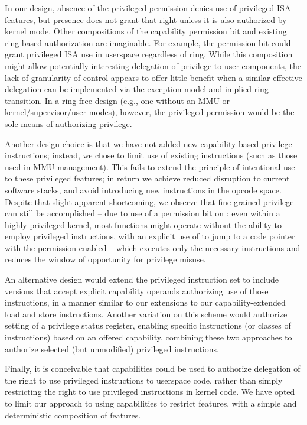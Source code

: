 In our design, absence of the privileged permission denies use of privileged
ISA features, but presence does not grant that right unless it is also
authorized by kernel mode.
Other compositions of the capability permission bit and existing
ring-based authorization are imaginable.
For example, the permission bit could grant privileged ISA use in userspace
regardless of ring.
While this composition might allow potentially interesting delegation of
privilege to user components, the lack of granularity of control appears to
offer little benefit when a similar effective delegation can be implemented
via the exception model and implied ring transition.
In a ring-free design (e.g., one without an MMU or kernel/supervisor/user
modes), however, the privileged permission would be the sole means of
authorizing privilege.

Another design choice is that we have not added new
capability-based privilege instructions; instead, we chose to limit use of
existing instructions (such as those used in MMU management).
This fails to extend the principle of intentional use to these privileged
features; in return we achieve reduced disruption to current software
stacks, and avoid introducing new instructions in the opcode space.
Despite that slight apparent shortcoming,
we observe that fine-grained privilege can still be accomplished --
due to use of a permission bit
on \PCC{}: even within a highly privileged
kernel, most functions might operate without the ability to employ privileged
instructions, with an explicit use of  to jump to a code
pointer with the \cappermASR{} permission enabled -- which
executes
only the necessary instructions and reduces the window of opportunity for
privilege misuse.

An alternative design would extend the privileged instruction set to
include versions that accept explicit capability operands authorizing use of
those instructions, in a manner similar to our extensions to our
capability-extended load and store instructions.
Another variation on this scheme would authorize setting of a privilege status
register, enabling specific instructions (or classes of instructions) based on
an offered capability, combining these two approaches to authorize selected
(but unmodified) privileged instructions.

Finally, it is conceivable that capabilities could be used to authorize
delegation of the right to use privileged instructions to userspace code,
rather than simply restricting the right to use privileged instructions in
kernel code.
We have opted to limit our approach to using capabilities to restrict features,
with a simple and deterministic composition of features.

